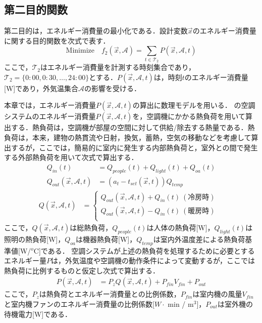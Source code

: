 \subsection{第二目的関数}
第二目的は，エネルギー消費量の最小化である．設計変数$\vec{x}$のエネルギー消費量に関する目的関数を次式で表す．
\begin{equation}
  \mbox{Minimize} \quad f_2(\vec{x},\mathcal{A}) = \sum_{t\in \mathcal{T}_2} P(\vec{x},\mathcal{A},t)
  \label{eq::math_objective2}
\end{equation}
ここで，$\mathcal{T}_2$はエネルギー消費量を計測する時刻集合であり，$\mathcal{T}_2=\{0:00, 0:30,\dots, 24:00\}$とする．$P(\vec{x},\mathcal{A},t)$は，時刻$t$のエネルギー消費量[W]であり，外気温集合$\mathcal{A}$の影響を受ける．

本章では，エネルギー消費量$P(\vec{x},\mathcal{A},t)$の算出に数理モデルを用いる．
の空調システムのエネルギー消費量$P(\vec{x},\mathcal{A},t)$を，空調機にかかる熱負荷を用いて算出する\cite{Kuki12}．熱負荷は，空調機が部屋の空間に対して供給/除去する熱量である．熱負荷は，本来，建物の熱貫流や日射，換気，蓄熱，空気の移動などを考慮して算出するが，ここでは，簡易的に室内に発生する内部熱負荷と，室外との間で発生する外部熱負荷を用いて次式で算出する．
\begin{align}
  Q_{in}(t)                      & = Q_{people}(t) + Q_{light}(t) + Q_{oa}(t)
  \label{eq::math_heatload_in}                                                \\
  Q_{out}(\vec{x},\mathcal{A},t) & = (a_t - t_{set}(\vec{x},t)) Q_{temp}
  \label{eq::math_heatload_out}
\end{align}
\vspace{-0.8cm}
\begin{align}
  Q(\vec{x},\mathcal{A},t) & =
  \begin{cases}
    Q_{out}(\vec{x},\mathcal{A},t) + Q_{in}(t)~(冷房時) & \\
    Q_{out}(\vec{x},\mathcal{A},t) - Q_{in}(t)~(暖房時) & \\
  \end{cases}
  \label{eq::math_heatload}
\end{align}
ここで，$Q(\vec{x},\mathcal{A},t) $は総熱負荷，$Q_{people}(t)$は人体の熱負荷[W]，$Q_{light}(t)$は照明の熱負荷[W]，$Q_{oa}$は機器熱負荷[W]，$Q_{temp}$は室内外温度差による熱負荷基準値[W/$^o$C]である．
空調システムが上述の熱負荷を処理するために必要とするエネルギー量$P$は，外気温度や空調機の動作条件によって変動するが，ここでは熱負荷に比例するものと仮定し次式で算出する．
\begin{align}
  P(\vec{x},\mathcal{A},t) & = P_zQ(\vec{x},\mathcal{A},t)+P_{fin}V_{fin}+P_{out}
  \label{eq::math_energy}
\end{align}
ここで，$P_z$は熱負荷とエネルギー消費量との比例係数，$P_{fin}$は室内機の風量$V_{fin}$と室内機ファンのエネルギー消費量の比例係数[$W \cdot$ min / m$^3$]，$P_{out}$は室外機の待機電力[W]である．

